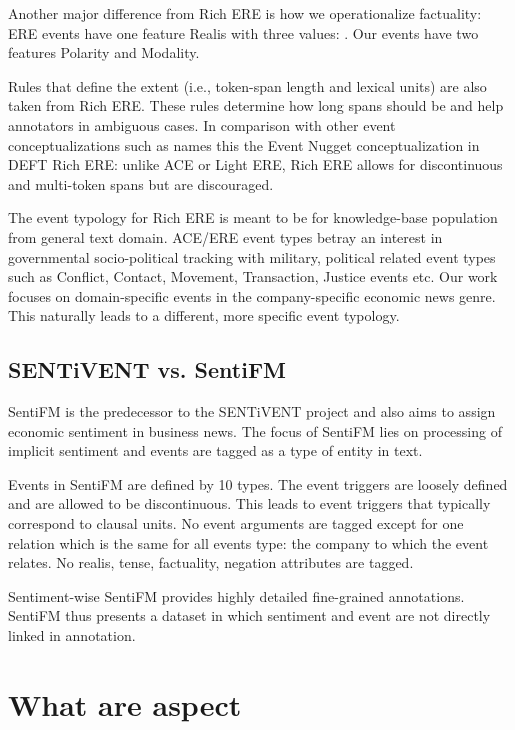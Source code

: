 Another major difference from Rich ERE is how we operationalize factuality:
ERE events have one feature Realis with three values: .
Our events have two features Polarity and Modality.

Rules that define the extent (i.e., token-span length and lexical units) are also taken from Rich ERE.
These rules determine how long spans should be and help annotators in ambiguous cases.
In comparison with other event conceptualizations such as \cite{sprugnoli2017} names this the Event Nugget conceptualization in DEFT Rich ERE: unlike ACE or Light ERE, Rich ERE allows for discontinuous and multi-token spans but are discouraged.

The event typology for Rich ERE is meant to be for knowledge-base population from general text domain.
ACE/ERE event types betray an interest in governmental socio-political tracking with military, political related event types such as Conflict, Contact, Movement, Transaction, Justice events etc.
Our work focuses on domain-specific events in the company-specific economic news genre.
This naturally leads to a different, more specific event typology.

\subsection{SENTiVENT vs. SentiFM}
SentiFM is the predecessor to the SENTiVENT project and also aims to assign economic sentiment in business news.
The focus of SentiFM lies on processing of implicit sentiment and events are tagged as a type of entity in text.

Events in SentiFM are defined by 10 types.
The event triggers are loosely defined and are allowed to be discontinuous.
This leads to event triggers that typically correspond to clausal units.
No event arguments are tagged except for one relation which is the same for all events type: the company to which the event relates.
No realis, tense, factuality, negation attributes are tagged.

Sentiment-wise SentiFM provides highly detailed fine-grained annotations.
SentiFM thus presents a dataset in which sentiment and event are not directly linked in annotation.

\section{What are aspect}

